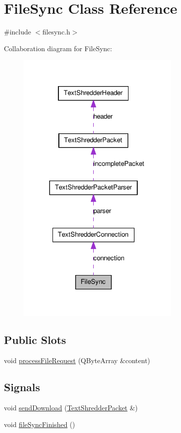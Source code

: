 \hypertarget{class_file_sync}{
\section{FileSync Class Reference}
\label{class_file_sync}
}


{\ttfamily \#include $<$filesync.h$>$}



Collaboration diagram for FileSync:\nopagebreak
\begin{figure}[H]
\begin{center}
\leavevmode
\includegraphics[width=226pt]{class_file_sync__coll__graph}
\end{center}
\end{figure}
\subsection*{Public Slots}
\begin{DoxyCompactItemize}
\item 
void \hyperlink{class_file_sync_a2be3e41d19e9f1f012ee0ff5a7d425a4}{processFileRequest} (QByteArray \&content)
\end{DoxyCompactItemize}
\subsection*{Signals}
\begin{DoxyCompactItemize}
\item 
void \hyperlink{class_file_sync_a11d7da6ffe6f47cda757cd7e8aad30b5}{sendDownload} (\hyperlink{class_text_shredder_packet}{TextShredderPacket} \&)
\item 
void \hyperlink{class_file_sync_a854f5334fb6b5cc67f8a5fd9bed6ae18}{fileSyncFinished} ()
\end{DoxyCompactItemize}
